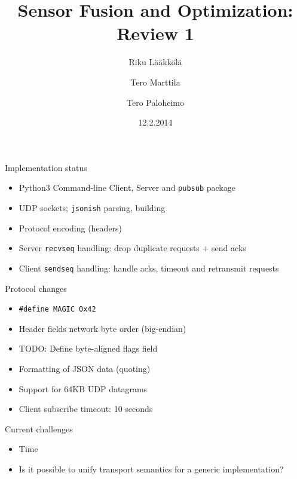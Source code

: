 \documentclass{beamer}
\title[SFO protocol]{Sensor Fusion and Optimization: Review 1}
\author{Riku Lääkkölä \and Tero Marttila \and Tero Paloheimo}
\institute{Aalto ELEC}
\date{12.2.2014}
\begin{document}
\begin{frame}
  \titlepage
\end{frame}

\begin{frame}{Implementation status}
\begin{itemize}
    \item Python3 Command-line Client, Server and \texttt{pubsub} package
    \item UDP sockets; \texttt{jsonish} parsing, building
    \item Protocol encoding (headers)
    \item Server \texttt{recvseq} handling: drop duplicate requests + send acks
    \item Client \texttt{sendseq} handling: handle acks, timeout and retransmit requests
\end{itemize}
\end{frame}

\begin{frame}{Protocol changes}
\begin{itemize}
    \item \texttt{\#define MAGIC 0x42}
    \item Header fields network byte order (big-endian)
  	\item TODO: Define byte-aligned flags field
    \item Formatting of JSON data (quoting)
    \item Support for 64KB UDP datagrams
    \item Client subscribe timeout: 10 seconds
\end{itemize}
\end{frame}

\begin{frame}{Current challenges}
\begin{itemize}
	\item Time
	\item Is it possible to unify transport semantics for a generic implementation?
\end{itemize}
\end{frame}
\end{document}
